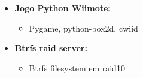 \documentclass[a4paper,portuguese]{article}
\begin{document}
\begin{itemize}
    \item[] {\bf Jogo Python Wiimote:}\\ \vspace{-7mm}
    \begin{itemize}
    \setlength{\itemsep}{-1mm}
        \item Pygame, python-box2d, cwiid
    \end{itemize}

    \item[] {\bf Btrfs raid server:}\\ \vspace{-7mm}
    \begin{itemize}
    \setlength{\itemsep}{-1mm}
        \item Btrfs filesystem em raid10
    \end{itemize}
\end{itemize}
\end{document}
